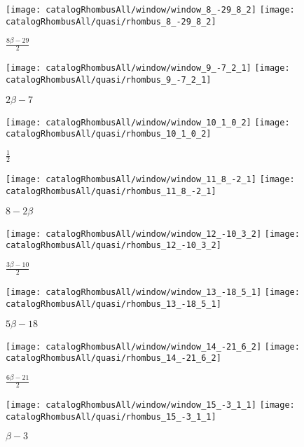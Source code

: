 \documentclass[text.tex]{subfiles}
\begin{document}
\begin{landscape}
\begin{figure}[h]
\centering
\texttt{[image: catalogRhombusAll/window/window\_8\_-29\_8\_2]}
\texttt{[image: catalogRhombusAll/quasi/rhombus\_8\_-29\_8\_2]}
\caption*{$\frac{8\beta-29}{2}$}
\end{figure}

\begin{figure}[h]
\centering
\texttt{[image: catalogRhombusAll/window/window\_9\_-7\_2\_1]}
\texttt{[image: catalogRhombusAll/quasi/rhombus\_9\_-7\_2\_1]}
\caption*{$2\beta-7$}
\end{figure}

\begin{figure}[h]
\centering
\texttt{[image: catalogRhombusAll/window/window\_10\_1\_0\_2]}
\texttt{[image: catalogRhombusAll/quasi/rhombus\_10\_1\_0\_2]}
\caption*{$\frac{1}{2}$}
\end{figure}

\thispagestyle{empty}
\begin{figure}[h]
\centering
\texttt{[image: catalogRhombusAll/window/window\_11\_8\_-2\_1]}
\texttt{[image: catalogRhombusAll/quasi/rhombus\_11\_8\_-2\_1]}
\caption*{$8-2\beta$}
\end{figure}

\begin{figure}[h]
\centering
\texttt{[image: catalogRhombusAll/window/window\_12\_-10\_3\_2]}
\texttt{[image: catalogRhombusAll/quasi/rhombus\_12\_-10\_3\_2]}
\caption*{$\frac{3\beta-10}{2}$}
\end{figure}

\begin{figure}[h]
\centering
\texttt{[image: catalogRhombusAll/window/window\_13\_-18\_5\_1]}
\texttt{[image: catalogRhombusAll/quasi/rhombus\_13\_-18\_5\_1]}
\caption*{$5\beta-18$}
\end{figure}

\begin{figure}[h]
\centering
\texttt{[image: catalogRhombusAll/window/window\_14\_-21\_6\_2]}
\texttt{[image: catalogRhombusAll/quasi/rhombus\_14\_-21\_6\_2]}
\caption*{$\frac{6\beta-21}{2}$}
\end{figure}

\begin{figure}[h]
\centering
\texttt{[image: catalogRhombusAll/window/window\_15\_-3\_1\_1]}
\texttt{[image: catalogRhombusAll/quasi/rhombus\_15\_-3\_1\_1]}
\caption*{$\beta-3$}
\end{figure}


\end{landscape}
\end{document}
